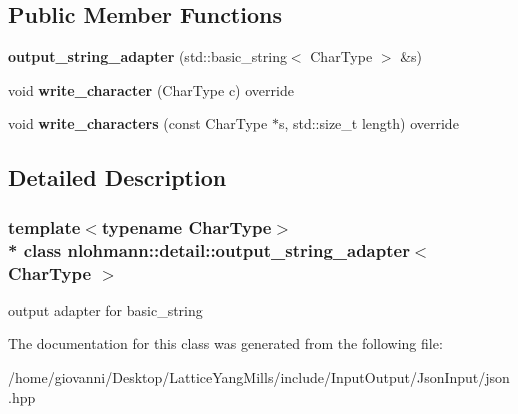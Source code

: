 \subsection*{Public Member Functions}
\begin{DoxyCompactItemize}
\item 
{\bfseries output\+\_\+string\+\_\+adapter} (std\+::basic\+\_\+string$<$ Char\+Type $>$ \&s)\hypertarget{classnlohmann_1_1detail_1_1output__string__adapter_a2086c9bd140c2ef28775fe190684fd68}{}\label{classnlohmann_1_1detail_1_1output__string__adapter_a2086c9bd140c2ef28775fe190684fd68}

\item 
void {\bfseries write\+\_\+character} (Char\+Type c) override\hypertarget{classnlohmann_1_1detail_1_1output__string__adapter_ae66b8b2b776acd4fc20bcb24dc7a4fac}{}\label{classnlohmann_1_1detail_1_1output__string__adapter_ae66b8b2b776acd4fc20bcb24dc7a4fac}

\item 
void {\bfseries write\+\_\+characters} (const Char\+Type $\ast$s, std\+::size\+\_\+t length) override\hypertarget{classnlohmann_1_1detail_1_1output__string__adapter_ad356f6e878ee105e72e66d18b665f623}{}\label{classnlohmann_1_1detail_1_1output__string__adapter_ad356f6e878ee105e72e66d18b665f623}

\end{DoxyCompactItemize}


\subsection{Detailed Description}
\subsubsection*{template$<$typename Char\+Type$>$\\*
class nlohmann\+::detail\+::output\+\_\+string\+\_\+adapter$<$ Char\+Type $>$}

output adapter for basic\+\_\+string 

The documentation for this class was generated from the following file\+:\begin{DoxyCompactItemize}
\item 
/home/giovanni/\+Desktop/\+Lattice\+Yang\+Mills/include/\+Input\+Output/\+Json\+Input/json.\+hpp\end{DoxyCompactItemize}
